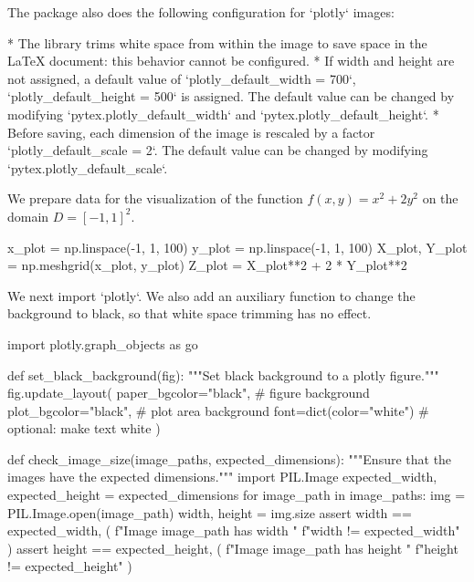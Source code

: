 \documentclass[oneside]{book}
\begin{document}
\begin{mdcell}
The package also does the following configuration for `plotly` images:

* The library trims white space from within the image to save space in the LaTeX document: this behavior cannot be configured.
* If width and height are not assigned, a default value of `plotly_default_width = 700`, `plotly_default_height = 500` is assigned. The default value can be changed by modifying `pytex.plotly_default_width` and `pytex.plotly_default_height`.
* Before saving, each dimension of the image is rescaled by a factor `plotly_default_scale = 2`. The default value can be changed by modifying `pytex.plotly_default_scale`.
\end{mdcell}

\begin{mdcell}
We prepare data for the visualization of the function $f(x, y) = x^2 + 2 y^2$ on the domain $D = [-1, 1]^2$.
\end{mdcell}

\begin{pycell}
x_plot = np.linspace(-1, 1, 100)
y_plot = np.linspace(-1, 1, 100)
X_plot, Y_plot = np.meshgrid(x_plot, y_plot)
Z_plot = X_plot**2 + 2 * Y_plot**2
\end{pycell}

\begin{mdcell}
We next import `plotly`. We also add an auxiliary function to change the background to black, so that white space trimming has no effect.
\end{mdcell}

\begin{pycell}
import plotly.graph_objects as go
\end{pycell}

\begin{pycell}
def set_black_background(fig):
    """Set black background to a plotly figure."""
    fig.update_layout(
        paper_bgcolor="black",   # figure background
        plot_bgcolor="black",    # plot area background
        font=dict(color="white") # optional: make text white
    )
\end{pycell}

\begin{pycell}
def check_image_size(image_paths, expected_dimensions):
    """Ensure that the images have the expected dimensions."""
    import PIL.Image
    expected_width, expected_height = expected_dimensions
    for image_path in image_paths:
        img = PIL.Image.open(image_path)
        width, height = img.size
        assert width == expected_width, (
            f"Image {image_path} has width "
            f"{width} != {expected_width}"
        )
        assert height == expected_height, (
            f"Image {image_path} has height "
            f"{height} != {expected_height}"
        )
\end{pycell}
\end{document}
